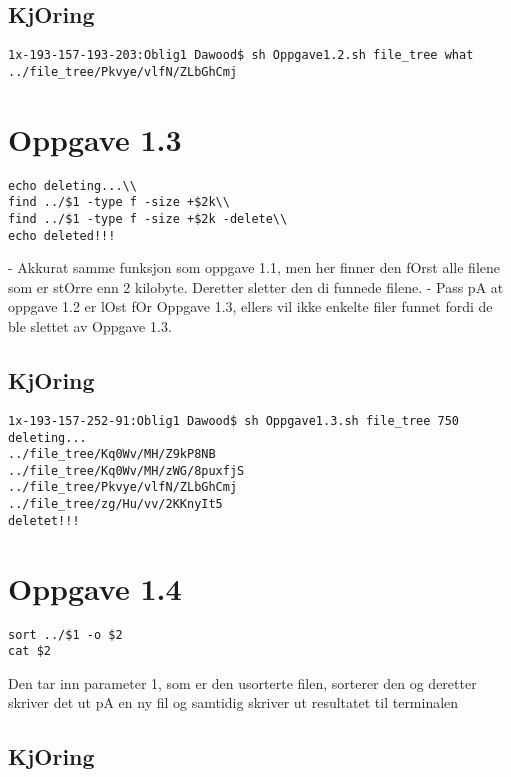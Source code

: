 \documentclass{article}
\begin{document}
\subsection*{KjOring}
\begin{Verbatim}
1x-193-157-193-203:Oblig1 Dawood$ sh Oppgave1.2.sh file_tree what
../file_tree/Pkvye/vlfN/ZLbGhCmj
\end{Verbatim}

\section*{Oppgave 1.3}
\begin{Verbatim}
echo deleting...\\
find ../$1 -type f -size +$2k\\
find ../$1 -type f -size +$2k -delete\\
echo deleted!!!
\end{Verbatim}
- Akkurat samme funksjon som oppgave 1.1, men her finner den fOrst alle filene som er stOrre enn 2 kilobyte. Deretter sletter den di funnede filene.\hfill \break
- Pass pA at oppgave 1.2 er lOst fOr Oppgave 1.3, ellers vil ikke enkelte filer funnet
fordi de ble slettet av Oppgave 1.3.


\subsection*{KjOring}

\begin{Verbatim}
1x-193-157-252-91:Oblig1 Dawood$ sh Oppgave1.3.sh file_tree 750
deleting...
../file_tree/Kq0Wv/MH/Z9kP8NB
../file_tree/Kq0Wv/MH/zWG/8puxfjS
../file_tree/Pkvye/vlfN/ZLbGhCmj
../file_tree/zg/Hu/vv/2KKnyIt5
deletet!!!
\end{Verbatim}

\section*{Oppgave 1.4}

\begin{Verbatim}
sort ../$1 -o $2
cat $2
\end{Verbatim}
Den tar inn parameter 1, som er den usorterte filen, sorterer den og deretter skriver det ut pA en ny fil og samtidig skriver ut resultatet til terminalen

\subsection*{KjOring}
\end{document}
